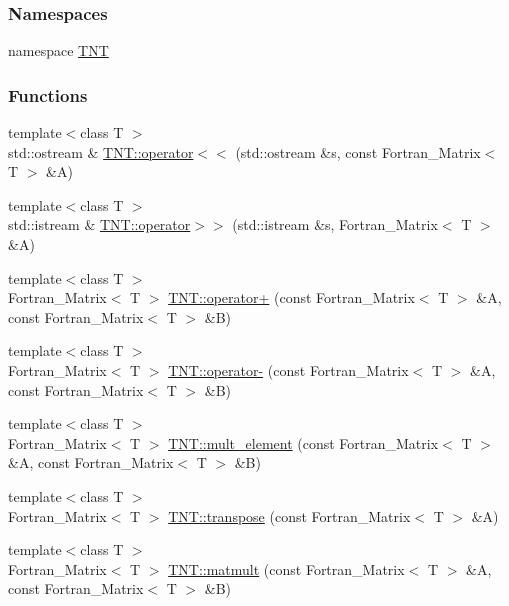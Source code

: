 \subsubsection*{Namespaces}
\begin{DoxyCompactItemize}
\item 
namespace \hyperlink{namespace_t_n_t}{TNT}
\end{DoxyCompactItemize}
\subsubsection*{Functions}
\begin{DoxyCompactItemize}
\item 
{\footnotesize template$<$class T $>$ }\\std::ostream \& \hyperlink{namespace_t_n_t_a0d9e650ba1ab4e1b962aa3b1b98de019}{TNT::operator$<$$<$} (std::ostream \&s, const Fortran\_\-Matrix$<$ T $>$ \&A)
\item 
{\footnotesize template$<$class T $>$ }\\std::istream \& \hyperlink{namespace_t_n_t_a06559afd57841f2cf098db8e64d36fa0}{TNT::operator$>$$>$} (std::istream \&s, Fortran\_\-Matrix$<$ T $>$ \&A)
\item 
{\footnotesize template$<$class T $>$ }\\Fortran\_\-Matrix$<$ T $>$ \hyperlink{namespace_t_n_t_a8025a7974a165fccf5457b055acfd543}{TNT::operator+} (const Fortran\_\-Matrix$<$ T $>$ \&A, const Fortran\_\-Matrix$<$ T $>$ \&B)
\item 
{\footnotesize template$<$class T $>$ }\\Fortran\_\-Matrix$<$ T $>$ \hyperlink{namespace_t_n_t_a8ffd86e3dac4b45866bd5dd6d24f8d4d}{TNT::operator-\/} (const Fortran\_\-Matrix$<$ T $>$ \&A, const Fortran\_\-Matrix$<$ T $>$ \&B)
\item 
{\footnotesize template$<$class T $>$ }\\Fortran\_\-Matrix$<$ T $>$ \hyperlink{namespace_t_n_t_a4b7ddb1829794d31797591c8031d92d1}{TNT::mult\_\-element} (const Fortran\_\-Matrix$<$ T $>$ \&A, const Fortran\_\-Matrix$<$ T $>$ \&B)
\item 
{\footnotesize template$<$class T $>$ }\\Fortran\_\-Matrix$<$ T $>$ \hyperlink{namespace_t_n_t_a26a8037bc1ceb0f12f38113b037488b4}{TNT::transpose} (const Fortran\_\-Matrix$<$ T $>$ \&A)
\item 
{\footnotesize template$<$class T $>$ }\\Fortran\_\-Matrix$<$ T $>$ \hyperlink{namespace_t_n_t_a2f4c6ff9e27fe318e0bc01be623ff260}{TNT::matmult} (const Fortran\_\-Matrix$<$ T $>$ \&A, const Fortran\_\-Matrix$<$ T $>$ \&B)

\end{DoxyCompactItemize}
